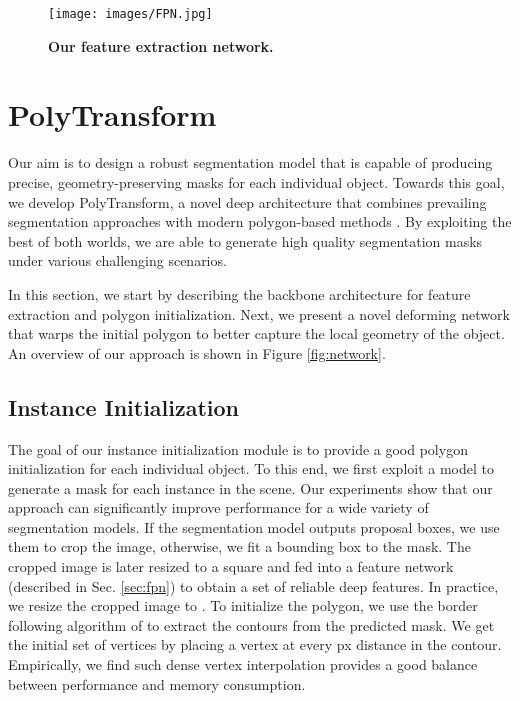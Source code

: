 \documentclass[10pt,twocolumn,letterpaper]{article}
\begin{document}
 



\begin{figure}[tb!]
\texttt{[image: images/FPN.jpg]}
\caption{\textbf{Our feature extraction network.}}
\vspace{-4mm}
\label{fig:fpn}
\end{figure}


\section{PolyTransform}
Our aim is to design a robust segmentation model that is capable of producing precise, geometry-preserving masks for each individual object. 
Towards this goal, we develop PolyTransform, a novel deep architecture that combines prevailing segmentation approaches \cite{mask-rcnn,upsnet} with modern polygon-based methods \cite{polygon-rnn,polygon-rnn++}. By exploiting the best of both worlds, we are able to generate high quality segmentation masks under various challenging scenarios.


In this section, we start by describing the backbone architecture for feature extraction and polygon initialization. 
Next, we present a novel deforming network that warps the initial polygon to better capture the local geometry of the object. An overview of our approach is shown in Figure \ref{fig:network}.






\subsection{Instance Initialization}
The goal of our instance initialization module is to provide a good polygon initialization for each individual object. To this end, we first exploit a  model to generate a mask for each instance in the scene. Our experiments show that our approach can significantly improve performance for a wide variety of segmentation models.  If the segmentation model outputs proposal boxes, we use them to crop the image, otherwise, we fit a bounding box to the mask. The cropped image is later resized to a square and fed into a feature network (described in Sec. \ref{sec:fpn})
to obtain a set of reliable deep features. In practice, we resize the cropped image to . To initialize the polygon, we use the border following algorithm of \cite{border-follow} to extract the contours from the predicted mask. We get the initial set of vertices by placing a vertex at every  px distance in the contour. 
Empirically, we find such dense vertex interpolation provides a good balance between performance and memory consumption.
\end{document}
